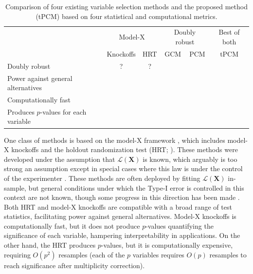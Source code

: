 \documentclass[12pt]{article}
\theoremstyle{definition}
\theoremstyle{remark}
\newcommand{\prx}{\bm X}								%
\newcommand{\law}{\mathcal L}							%
\begin{document}
	\begin{table}[h]
		\centering
		\begin{tabular}{l|cc|cc|c}
		& \multicolumn{2}{c|}{Model-X} & \multicolumn{2}{c|}{Doubly robust} & Best of both \\ 
		\cline{2-6}
		& Knockoffs & HRT & GCM & PCM & tPCM \\ 
		\hline
		Doubly robust & ?  & ?  & \checkmark & \checkmark & \checkmark \\
		Power against general alternatives & \checkmark & \checkmark &  & \checkmark & \checkmark \\ 
		Computationally fast & \checkmark &  &  &  & \checkmark \\ 
		Produces $p$-values for each variable &  & \checkmark & \checkmark & \checkmark & \checkmark \\ 
		\end{tabular}
		\caption{Comparison of four existing variable selection methods and the proposed method (tPCM) based on four statistical and computational metrics.}
		\label{tab:comparison}
	\end{table}
	
	One class of methods is based on the model-X framework \citep{CetL16}, which includes model-X knockoffs \citep{CetL16} and the holdout randomization test (HRT; \cite{Tansey2018}). These methods were developed under the assumption that $\law(\prx)$ is known, which arguably is too strong an assumption except in special cases where this law is under the control of the experimenter \citep{Ham2022a,Aufiero2022a}. These methods are often deployed by fitting $\law(\prx)$ in-sample, but general conditions under which the Type-I error is controlled in this context are not known, though some progress in this direction has been made \citep{Fan2018a,Fan2023}. Both HRT and model-X knockoffs are compatible with a broad range of test statistics, facilitating power against general alternatives. Model-X knockoffs is computationally fast, but it does not produce $p$-values quantifying the significance of each variable, hampering interpretability in applications. On the other hand, the HRT produces $p$-values, but it is computationally expensive, requiring $O(p^2)$ resamples (each of the $p$ variables requires $O(p)$ resamples to reach significance after multiplicity correction).	
\end{document}
